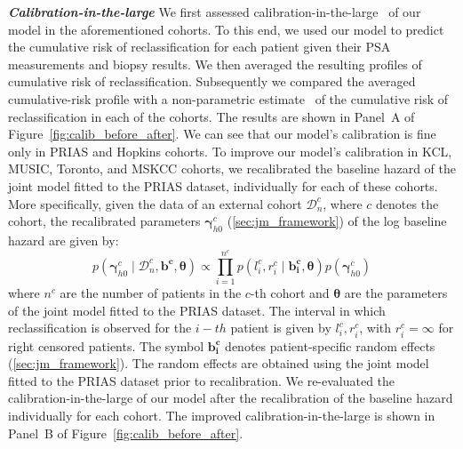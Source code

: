 \textbf{\textit{Calibration-in-the-large}}
We first assessed calibration-in-the-large~\citep{steyerberg2010assessing} of our model in the aforementioned cohorts. To this end, we used our model to predict the cumulative risk of reclassification for each patient given their PSA measurements and biopsy results. We then averaged the resulting profiles of cumulative risk of reclassification. Subsequently we compared the averaged cumulative-risk profile with a non-parametric estimate~\citep{turnbull1976empirical} of the cumulative risk of reclassification in each of the cohorts. The results are shown in Panel~A of Figure~\ref{fig:calib_before_after}. We can see that our model's calibration is fine only in PRIAS and Hopkins cohorts. To improve our model's calibration in KCL, MUSIC, Toronto, and MSKCC cohorts, we recalibrated the baseline hazard of the joint model fitted to the PRIAS dataset, individually for each of these cohorts. More specifically, given the data of an external cohort $\mathcal{D}_n^c$, where $c$ denotes the cohort, the recalibrated parameters $\boldsymbol{\gamma}_{h0}^c$ (\ref{sec:jm_framework}) of the log baseline hazard are given by:
\begin{equation}
p(\boldsymbol{\gamma}_{h0}^c \mid \mathcal{D}_n^c, \boldsymbol{b^c},  \boldsymbol{\theta}) \propto  \prod_{i=1}^{n^c} p(l_i^c, r_i^c \mid \boldsymbol{b^c_i}, \boldsymbol{\theta}) p(\boldsymbol{\gamma}_{h0}^c)
\end{equation}
where $n^c$ are the number of patients in the $c$-th cohort and $\boldsymbol{\theta}$ are the parameters of the joint model fitted to the PRIAS dataset. The interval in which reclassification is observed for the $i-th$ patient is given by $l_i^c, r_i^c$, with $r_i^c = \infty$ for right censored patients. The symbol $\boldsymbol{b^c_i}$ denotes patient-specific random effects (\ref{sec:jm_framework}). The random effects are obtained using the joint model fitted to the PRIAS dataset prior to recalibration. We re-evaluated the calibration-in-the-large of our model after the recalibration of the baseline hazard individually for each cohort. The improved calibration-in-the-large is shown in Panel~B of Figure~\ref{fig:calib_before_after}.

